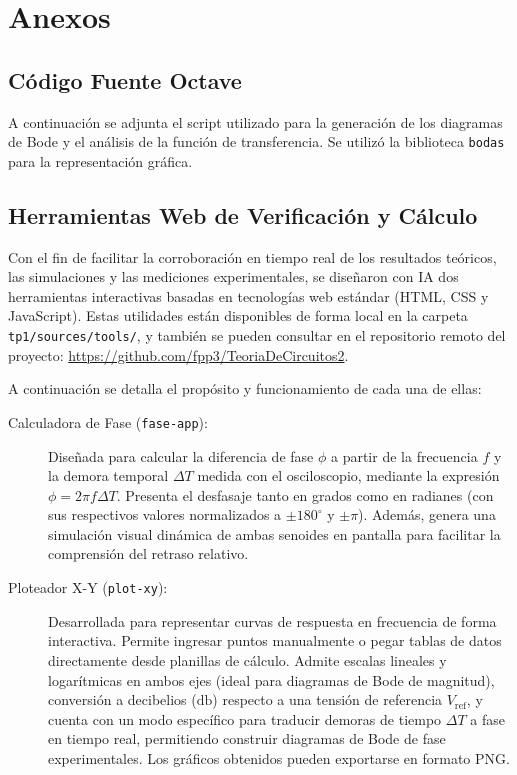 \chapter{Anexos}

\section{Código Fuente Octave}
\label{sec:ej1_anexo_octave}

A continuación se adjunta el script utilizado para la generación de los diagramas de Bode y el análisis de la función
de transferencia. Se utilizó la biblioteca \texttt{bodas} \cite{bodas} para la representación gráfica.



\section{Herramientas Web de Verificación y Cálculo}
\label{sec:herramientas_web}

Con el fin de facilitar la corroboración en tiempo real de los resultados teóricos, las
simulaciones y las mediciones experimentales, se diseñaron con IA dos herramientas interactivas basadas
en tecnologías web estándar (HTML, CSS y JavaScript). Estas utilidades están disponibles de forma
local en la carpeta \texttt{tp1/sources/tools/}, y también se pueden consultar en el repositorio
remoto del proyecto: \url{https://github.com/fpp3/TeoriaDeCircuitos2}.

A continuación se detalla el propósito y funcionamiento de cada una de ellas:

\begin{description}
  \item[Calculadora de Fase (\texttt{fase-app}):] Diseñada para calcular la diferencia de fase
  $\phi$ a partir de la frecuencia $f$ y la demora temporal $\Delta T$ medida con el osciloscopio,
  mediante la expresión $\phi = 2\pi f \Delta T$. Presenta el desfasaje tanto en grados como en
  radianes (con sus respectivos valores normalizados a $\pm 180^\circ$ y $\pm \pi$). Además,
  genera una simulación visual dinámica de ambas senoides en pantalla para facilitar la
  comprensión del retraso relativo.

  \item[Ploteador X-Y (\texttt{plot-xy}):] Desarrollada para representar curvas de respuesta en
  frecuencia de forma interactiva. Permite ingresar puntos manualmente o pegar tablas de datos
  directamente desde planillas de cálculo. Admite escalas lineales y logarítmicas en ambos ejes
  (ideal para diagramas de Bode de magnitud), conversión a decibelios ($\si{\decibel}$) respecto a
  una tensión de referencia $V_{\text{ref}}$, y cuenta con un modo específico para traducir
  demoras de tiempo $\Delta T$ a fase en tiempo real, permitiendo construir diagramas de Bode de
  fase experimentales. Los gráficos obtenidos pueden exportarse en formato PNG.
\end{description}

